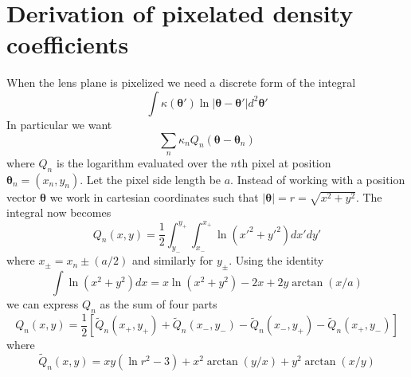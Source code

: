 \documentclass[onecolumn,galley]{mn2e}
\newcommand{\Rmap}{\ensuremath{R_\mathrm{map}}}
\newcommand{\Rpix}{\ensuremath{R_\mathrm{pix}}}
\renewcommand{\vec}[1]{\ensuremath{\boldsymbol{#1}}}
\newcommand\plottwo[2]{{%
 \centering
 \leavevmode
 \columnwidth=.45\columnwidth
 \texttt{[image: \#1]}%
 \hfil
 \texttt{[image: \#2]}%
}}%
\begin{document}

\section{Derivation of pixelated density coefficients}
\label{Q derivation}
When the lens plane is pixelized we need a discrete form of the integral
%
\[\int \kappa(\vec\theta') \ln |\vec\theta-\vec\theta'| d^2\vec\theta' \]
%
In particular we want
%
\[\sum_n \kappa_n Q_n(\vec\theta - \vec\theta_n)\]
%
where $Q_n$ is the logarithm evaluated over the $n$th pixel at position $\vec\theta_n = (x_n, y_n)$. Let the pixel side length be $a$.
Instead of working with a position vector $\vec\theta$ we work in cartesian coordinates such that
%
$|\vec\theta| = r = \sqrt{x^2 + y^2}$. The integral now becomes
%
\[Q_n(x,y) = \frac12 \int_{y_-}^{y_+}\int_{x_-}^{x_+} \ln (x'^2+y'^2) dx' dy'\]
%
where $x_\pm = x_n \pm (a/2)$ and similarly for $y_\pm$.
Using the identity
%
\[\int \ln(x^2+y^2) dx = x \ln(x^2+y^2) - 2x + 2y\arctan(x/a) \]
%
we can express $Q_n$ as the sum of four parts
%
\[Q_n(x,y) = \frac12 \left[ \tilde Q_n(x_+,y_+)
        + \tilde Q_n(x_-,y_-)
        - \tilde Q_n(x_-,y_+)
        - \tilde Q_n(x_+,y_-) \right]\]
%
where
%
\[\tilde Q_n(x,y) = xy(\ln r^2 - 3) + x^2\arctan(y/x) + y^2\arctan(x/y)\]



\end{document}
